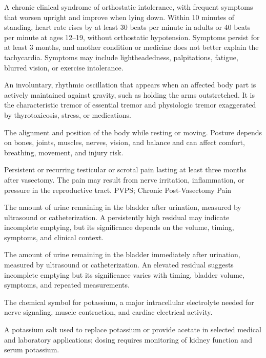  A chronic clinical syndrome of
orthostatic intolerance, with frequent symptoms that worsen upright and improve when lying
down. Within 10 minutes of standing, heart rate rises by at least 30 beats per minute in
adults or 40 beats per minute at ages 12--19, without orthostatic hypotension. Symptoms
persist for at least 3 months, and another condition or medicine does not better explain the
tachycardia. Symptoms may include lightheadedness, palpitations, fatigue, blurred vision, or
exercise intolerance.

 An involuntary, rhythmic oscillation that appears when an affected body part is actively maintained against gravity, such as holding the arms outstretched. It is the characteristic tremor of essential tremor and physiologic tremor exaggerated by thyrotoxicosis, stress, or medications.

 The alignment and position of the body while resting or moving. Posture depends on bones, joints, muscles, nerves, vision, and balance and can affect comfort, breathing, movement, and injury risk.

 Persistent or recurring testicular or scrotal pain lasting at least three months after vasectomy. The pain may result from nerve irritation, inflammation, or pressure in the reproductive tract.
\synonyms
PVPS; Chronic Post-Vasectomy Pain

 The amount of urine remaining in the bladder after urination, measured by ultrasound or
catheterization. A persistently high residual may indicate incomplete emptying, but its
significance depends on the volume, timing, symptoms, and clinical context.

 The amount of urine remaining in the bladder immediately after urination, measured by
ultrasound or catheterization. An elevated residual suggests incomplete emptying but
its significance varies with timing, bladder volume, symptoms, and repeated measurements.

 The chemical symbol for potassium, a major intracellular electrolyte needed for nerve signaling, muscle contraction, and cardiac electrical activity.

 A potassium salt used to replace potassium or provide acetate in selected medical and laboratory applications; dosing requires monitoring of kidney function and serum potassium.

